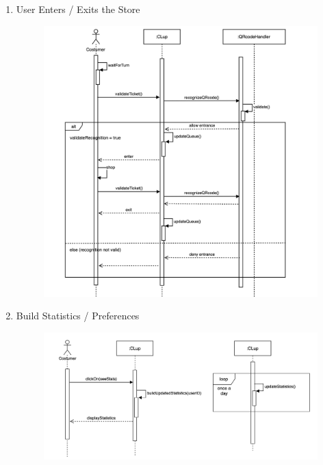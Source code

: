\documentclass[]{article}
\begin{document}
\begin{enumerate}
						\newpage
						\item User Enters / Exits the Store
							\begin{figure}[H]
								\centering
								\includegraphics[scale=1.1]{enterexit.png}
								\caption{}
								\label{fig:enterexit_sequencediagram}
							\end{figure}

						\newpage	
						\item Build Statistics / Preferences
							\begin{figure}[H]
								\centering
								\includegraphics[width=\linewidth]{buildStats.png}
								\caption{}
								\label{fig:buildstats_sequencediagram}
							\end{figure}
						

\end{enumerate}
\end{document}

